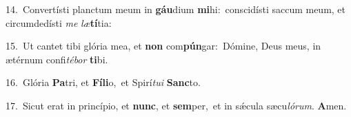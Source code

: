 {\numbfont\textcolor{\numbcolor}{14.}}~Convertísti planctum meum in \textbf{gáu}\-dium \textbf{mi}\-hi:~\star conscidísti saccum meum, et circumdedísti \textit{me} \textit{læ}\-\textbf{tí}tia:\par
{\numbfont\textcolor{\numbcolor}{15.}}~Ut cantet tibi glória mea, et \textbf{non} com\-\textbf{pún}\-gar:~\star Dómine, Deus meus, in ætérnum confi\-\textit{té}\-\textit{bor} \textbf{ti}\-bi.\par
{\numbfont\textcolor{\numbcolor}{16.}}~Glória \textbf{Pa}\-tri, et \textbf{Fí}\-\textbf{li}o,~\star et Spirí\-\textit{tu}\-\textit{i} \textbf{Sanc}\-to.\par
{\numbfont\textcolor{\numbcolor}{17.}}~Sicut erat in princípio, et \textbf{nunc}\-, et \textbf{sem}\-per,~\star et in sǽcula sæcu\-\textit{ló}\-\textit{rum}. \textbf{A}\-men.\par

